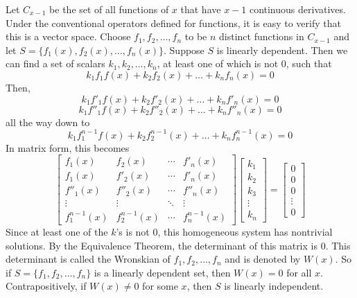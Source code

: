 \documentclass[12pt]{article}
\begin{document}
Let $C_{x - 1}$ be the set of all functions of $x$ that have $x - 1$ continuous derivatives. Under the conventional operators defined for functions, it is easy to verify that this is a vector space. Choose $f_1, f_2, \dots, f_n$ to be $n$ distinct functions in $C_{x - 1}$ and let $S = \{f_1(x), f_2(x), \dots, f_n(x)\}$. Suppose $S$ is linearly dependent. Then we can find a set of scalars $k_1, k_2, \dots, k_n$, at least one of which is not 0, such that $$k_1f_1f(x) + k_2f_2(x) + \dots + k_nf_n(x) = 0$$ Then, $$k_1f'_1f(x) + k_2f'_2(x) + \dots + k_nf'_n(x) = 0$$ $$k_1f''_1f(x) + k_2f''_2(x) + \dots + k_nf''_n(x) = 0$$ all the way down to $$k_1f^{n - 1}_1f(x) + k_2f^{n - 1}_2(x) + \dots + k_nf^{n - 1}_n(x) = 0$$ In matrix form, this becomes $$\begin{bmatrix} f_1(x) & f_2(x) & \cdots & f'_n(x) \\ f_1(x) & f'_2(x) & \cdots & f'_n(x) \\ f''_1(x) & f''_2(x) & \cdots & f''_n(x) \\ \vdots & \vdots & \ddots & \vdots \\ f^{n - 1}_1(x) & f^{n - 1}_2(x) & \cdots & f^{n - 1}_n(x) \end{bmatrix} \begin{bmatrix} k_1 \\ k_2 \\ k_3 \\ \vdots \\ k_n \end{bmatrix} = \begin{bmatrix} 0 \\ 0 \\ 0 \\ \vdots \\ 0 \end{bmatrix}$$ Since at least one of the $k$'s is not 0, this homogeneous system has nontrivial solutions. By the Equivalence Theorem, the determinant of this matrix is 0. This determinant is called the Wronskian of $f_1, f_2, \dots, f_n$ and is denoted by $W(x)$. So if $S = \{f_1, f_2, \dots, f_n\}$ is a linearly dependent set, then $W(x) = 0$ for all $x$. Contrapositively, if $W(x) \neq 0$ for some $x$, then $S$ is linearly independent. 
\end{document}
